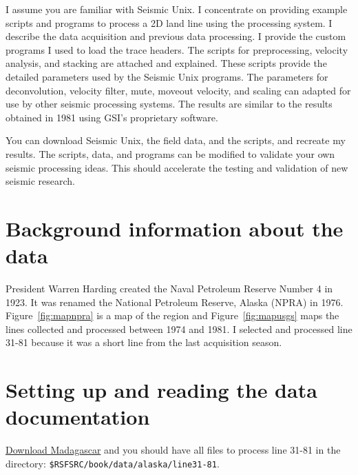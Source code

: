 I assume you are familiar with Seismic Unix.  I concentrate
on providing example scripts and programs to process a 2D land line
using the processing system. I describe the data acquisition and
previous data processing.  I provide the custom programs I used to
load the trace headers.  The scripts for preprocessing, velocity
analysis, and stacking are attached and explained.  These scripts
provide the detailed parameters used by the Seismic Unix programs.
The parameters for deconvolution, velocity filter, mute, moveout
velocity, and scaling can adapted for use by other seismic processing
systems. The results are similar to the results obtained in 1981 using
GSI's proprietary software.  

You can download Seismic Unix, the field data, and the scripts, and 
recreate my results.  The scripts, data, and programs can be modified 
to validate your own seismic processing ideas.  This should accelerate 
the testing and validation of new seismic research.

\section{Background information about the data}

President Warren Harding created the Naval Petroleum Reserve Number 4
in 1923.  It was renamed the National Petroleum Reserve, Alaska (NPRA)
in 1976.  Figure~\ref{fig:mapnpra} is a map of the region and 
Figure~\ref{fig:mapusgs} maps the lines collected and processed between 1974
and 1981.  I selected and processed line 31-81 because it was a short
line from the last acquisition season.

\section{Setting up and reading the data documentation}
\href{http://www.ahay.org/wiki/Download}{Download Madagascar} and you
should have all files to process line 31-81 in 
the directory: \texttt{\$RSFSRC/book/data/alaska/line31-81}.

